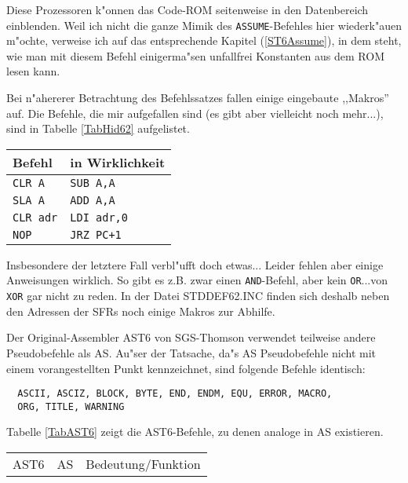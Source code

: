 \documentclass[12pt,a4paper,twoside]{report}
\newcommand{\tty}[1]{{\tt #1}}
\begin{document}
{Diese Prozessoren k"onnen das Code-ROM seitenweise in den Datenbereich
einblenden.  Weil ich nicht die ganze Mimik des \tty{ASSUME}-Befehles
hier wiederk"auen m"ochte, verweise ich auf das entsprechende Kapitel
(\ref{ST6Assume}), in dem steht, wie man mit diesem Befehl einigerma"sen
unfallfrei Konstanten aus dem ROM lesen kann.
\par
Bei n"ahererer Betrachtung des Befehlssatzes fallen einige eingebaute
,,Makros'' auf.  Die Befehle, die mir aufgefallen sind (es gibt aber
vielleicht noch mehr...), sind in Tabelle \ref{TabHid62} aufgelistet.
\par
\begin{table*}[htbp]
\begin{center}\begin{tabular}{|l|l|}
\hline
Befehl   & in Wirklichkeit \\
\hline
\hline
\tty{CLR A}    & \tty{SUB A,A} \\
\tty{SLA A}    & \tty{ADD A,A} \\
\tty{CLR adr}  & \tty{LDI adr,0} \\
\tty{NOP}      & \tty{JRZ PC+1} \\
\hline
\end{tabular}\end{center}
\caption{versteckte Makros im ST6225-Befehlssatz\label{TabHid62}}
\end{table*}
Insbesondere der letztere Fall verbl"ufft doch etwas...
Leider fehlen aber einige Anweisungen wirklich.  So gibt es z.B. zwar einen
\tty{AND}-Befehl, aber kein \tty{OR}...von \tty{XOR} gar nicht zu
reden.  In der Datei  STDDEF62.INC finden sich deshalb neben den Adressen
der SFRs noch einige Makros zur Abhilfe.
\par
Der Original-Assembler AST6 von SGS-Thomson verwendet teilweise andere
Pseudobefehle als AS.  Au"ser der Tatsache, da"s AS Pseudobefehle nicht
mit einem vorangestellten Punkt kennzeichnet, sind folgende Befehle
identisch:
\begin{verbatim}
  ASCII, ASCIZ, BLOCK, BYTE, END, ENDM, EQU, ERROR, MACRO,
  ORG, TITLE, WARNING
\end{verbatim}
Tabelle \ref{TabAST6} zeigt die AST6-Befehle, zu denen analoge in AS
existieren.
\par
\begin{table*}[htbp]
\begin{center}\begin{tabular}{|l|l|l|}
\hline
AST6           &   AS                & Bedeutung/Funktion \\

\end{tabular}
\end{center}
\end{table*}}
\end{document}
